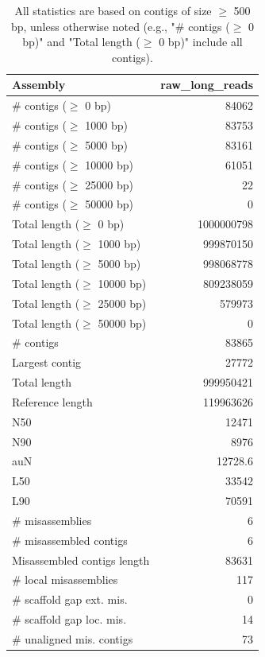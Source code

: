 \documentclass[12pt,a4paper]{article}
\begin{document}
\begin{table}[ht]
\begin{center}
\caption{All statistics are based on contigs of size $\geq$ 500 bp, unless otherwise noted (e.g., "\# contigs ($\geq$ 0 bp)" and "Total length ($\geq$ 0 bp)" include all contigs).}
\begin{tabular}{|l*{1}{|r}|}
\hline
Assembly & raw\_long\_reads \\ \hline
\# contigs ($\geq$ 0 bp) & 84062 \\ \hline
\# contigs ($\geq$ 1000 bp) & 83753 \\ \hline
\# contigs ($\geq$ 5000 bp) & 83161 \\ \hline
\# contigs ($\geq$ 10000 bp) & 61051 \\ \hline
\# contigs ($\geq$ 25000 bp) & 22 \\ \hline
\# contigs ($\geq$ 50000 bp) & 0 \\ \hline
Total length ($\geq$ 0 bp) & 1000000798 \\ \hline
Total length ($\geq$ 1000 bp) & 999870150 \\ \hline
Total length ($\geq$ 5000 bp) & 998068778 \\ \hline
Total length ($\geq$ 10000 bp) & 809238059 \\ \hline
Total length ($\geq$ 25000 bp) & 579973 \\ \hline
Total length ($\geq$ 50000 bp) & 0 \\ \hline
\# contigs & 83865 \\ \hline
Largest contig & 27772 \\ \hline
Total length & 999950421 \\ \hline
Reference length & 119963626 \\ \hline
N50 & 12471 \\ \hline
N90 & 8976 \\ \hline
auN & 12728.6 \\ \hline
L50 & 33542 \\ \hline
L90 & 70591 \\ \hline
\# misassemblies & 6 \\ \hline
\# misassembled contigs & 6 \\ \hline
Misassembled contigs length & 83631 \\ \hline
\# local misassemblies & 117 \\ \hline
\# scaffold gap ext. mis. & 0 \\ \hline
\# scaffold gap loc. mis. & 14 \\ \hline
\# unaligned mis. contigs & 73 \\ \hline

\end{tabular}
\end{center}
\end{table}
\end{document}
